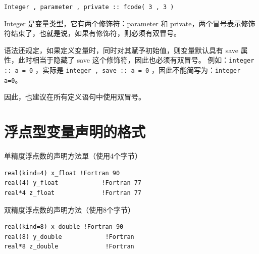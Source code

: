 \verb|Integer , parameter , private :: fcode( 3 , 3 )|

Integer 是变量类型，它有两个修饰符：parameter 和 private，两个冒号表示修饰符结束了，也就是说，如果有修饰符，则必须有双冒号。

语法还规定，如果定义变量时，同时对其赋予初始值，则变量默认具有 save 属性，此时相当于隐藏了 save 这个修饰符，因此也必须有双冒号。
例如：\verb|integer :: a = 0| ，实际是 \verb|integer , save :: a = 0| ，因此不能简写为：\verb|integer a=0|。

因此，也建议在所有定义语句中使用双冒号。


\section{浮点型变量声明的格式}
单精度浮点数的声明方法單（使用4个字节）
\begin{verbatim}
real(kind=4) x_float !Fortran 90
real(4) y_float            !Fortran 77
real*4 z_float             !Fortran 77
\end{verbatim}

双精度浮点数的声明方法（使用8个字节）
\begin{verbatim}
real(kind=8) x_double !Fortran 90
real(8) y_double            !Fortran
real*8 z_double             !Fortran
\end{verbatim}



